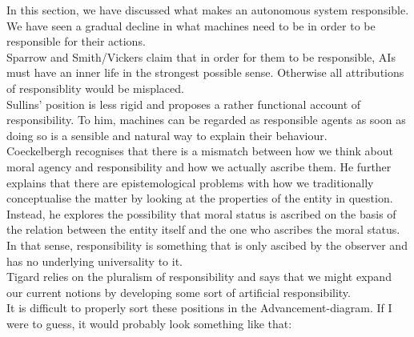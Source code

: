 \documentclass{article}
\begin{document}
In this section, we have discussed what makes an autonomous system responsible.
We have seen a gradual decline in what machines need to be in order to be
responsible for their actions.\\
Sparrow and Smith/Vickers claim that in order for them to be responsible, AIs
must have an inner life in the strongest possible sense. Otherwise all
attributions of responsiblity would be misplaced.\\
Sullins' position is less rigid and proposes a rather functional account of
responsibility. To him, machines can be regarded as responsible agents as soon
as doing so is a sensible and natural way to explain their behaviour.\\
Coeckelbergh recognises that there is a mismatch between how we think about
moral agency and responsibility and how we actually ascribe them. He further
explains that there are epistemological problems with how we traditionally
conceptualise the matter by looking at the properties of the entity in question.
Instead, he explores the possibility that moral status is ascribed on the basis
of the relation between the entity itself and the one who ascribes the moral
status. In that sense, responsibility is something that is only ascibed by the
observer and has no underlying universality to it.\\
Tigard relies on the pluralism of responsibility and says that we might
expand our current notions by developing some sort of artificial responsibility.\\


It is difficult to properly sort these positions in the Advancement-diagram. If
I were to guess, it would probably look something like that:\\





%
%



\end{document}
